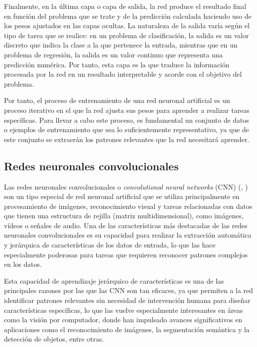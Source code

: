 Finalmente, en la última capa o capa de salida, la red produce el resultado final en función del problema que se trate y de la predicción calculada haciendo uso de los pesos ajustados en las capas ocultas. La naturaleza de la salida varía según el tipo de tarea que se realice: en un problema de clasificación, la salida es un valor discreto que indica la clase a la que pertenece la entrada, mientras que en un problema de regresión, la salida es un valor continuo que representa una predicción numérica. Por tanto, esta capa es la que traduce la información procesada por la red en un resultado interpretable y acorde con el objetivo del problema.\newline

Por tanto, el proceso de entrenamiento de una red neuronal artificial es un proceso iterativo en el que la red ajusta sus pesos para aprender a realizar tareas específicas. Para llevar a cabo este proceso, es fundamental un conjunto de datos o ejemplos de entrenamiento que sea lo suficientemente representativo, ya que de este conjunto se extraerán los patrones relevantes que la red necesitará aprender.\newline

\subsection{Redes neuronales convolucionales}\label{subsec:redes-neuronales-convolucionales}

Las redes neuronales convolucionales o \emph{convolutional neural networks} (CNN) (\cite{LeCun1989}, \cite{LeCun1998}) son un tipo especial de red neuronal artificial que se utiliza principalmente en procesamiento de imágenes, reconocimiento visual y tareas relacionadas con datos que tienen una estructura de rejilla (matriz multidimensional), como imágenes, vídeos o señales de audio. Una de las características más destacadas de las redes neuronales convolucionales es su capacidad para realizar la extracción automática y jerárquica de características de los datos de entrada, lo que las hace especialmente poderosas para tareas que requieren reconocer patrones complejos en los datos.\newline

Esta capacidad de aprendizaje jerárquico de características es una de las principales razones por las que las CNN son tan eficaces, ya que permiten a la red identificar patrones relevantes sin necesidad de intervención humana para diseñar características específicas, lo que las vuelve especialmente interesantes en áreas como la visión por computador, donde han impulsado avances significativos en aplicaciones como el reconocimiento de imágenes, la segmentación semántica y la detección de objetos, entre otras.\newline

